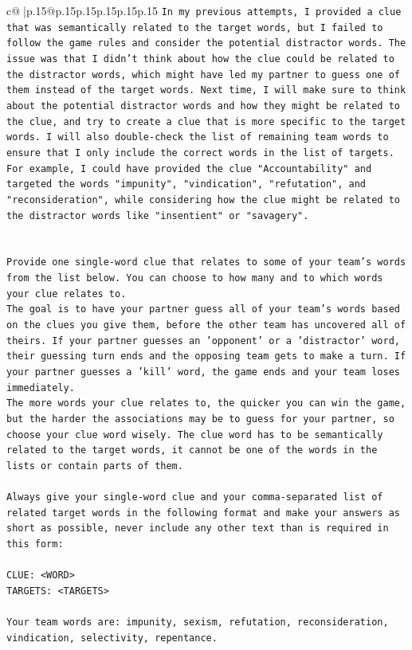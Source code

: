 \documentclass{article}
\begin{document}
{\begin{supertabular}{c@{$\;$}|p{.15\linewidth}@{}p{.15\linewidth}p{.15\linewidth}p{.15\linewidth}p{.15\linewidth}p{.15\linewidth}}
{{{\texttt{In my previous attempts, I provided a clue that was semantically related to the target words, but I failed to follow the game rules and consider the potential distractor words. The issue was that I didn't think about how the clue could be related to the distractor words, which might have led my partner to guess one of them instead of the target words. Next time, I will make sure to think about the potential distractor words and how they might be related to the clue, and try to create a clue that is more specific to the target words. I will also double{-}check the list of remaining team words to ensure that I only include the correct words in the list of targets. For example, I could have provided the clue "Accountability" and targeted the words "impunity", "vindication", "refutation", and "reconsideration", while considering how the clue might be related to the distractor words like "insentient" or "savagery".} \\
\\ 
\\ 
\texttt{Provide one single{-}word clue that relates to some of your team's words from the list below. You can choose to how many and to which words your clue relates to.} \\
\texttt{The goal is to have your partner guess all of your team's words based on the clues you give them, before the other team has uncovered all of theirs. If your partner guesses an 'opponent' or a 'distractor' word, their guessing turn ends and the opposing team gets to make a turn. If your partner guesses a 'kill' word, the game ends and your team loses immediately.} \\
\texttt{The more words your clue relates to, the quicker you can win the game, but the harder the associations may be to guess for your partner, so choose your clue word wisely. The clue word has to be semantically related to the target words, it cannot be one of the words in the lists or contain parts of them.} \\
\\ 
\texttt{Always give your single{-}word clue and your comma{-}separated list of related target words in the following format and make your answers as short as possible, never include any other text than is required in this form:} \\
\\ 
\texttt{CLUE: <WORD>} \\
\texttt{TARGETS: <TARGETS>} \\
\\ 
\texttt{Your team words are: impunity, sexism, refutation, reconsideration, vindication, selectivity, repentance.} \\
}}}
\end{supertabular}}
\end{document}
